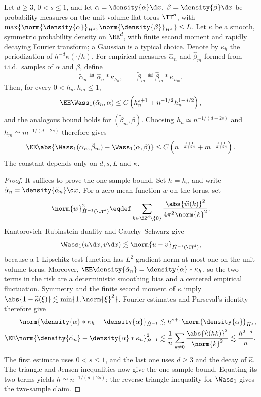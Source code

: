 \begin{prop}\label{prop-smooth-plugin-w1-rate}
	Let \(d\geq3\), \(0<s\leq1\), and let \(\alpha=\density{\alpha}\d x\), \(\beta=\density{\beta}\d x\) be probability measures on the unit-volume flat torus \(\TT^d\), with \(\max\{\norm{\density{\alpha}}_{H^s},\norm{\density{\beta}}_{H^s}\}\leq L\). Let \(\kappa\) be a smooth, symmetric probability density on \(\RR^d\), with finite second moment and rapidly decaying Fourier transform; a Gaussian is a typical choice. Denote by \(\kappa_h\) the periodization of \(h^{-d}\kappa(\cdot/h)\). For empirical measures \(\hat\alpha_n\) and \(\hat\beta_m\) formed from i.i.d.\ samples of \(\alpha\) and \(\beta\), define
	\[
		\tilde\alpha_n
		\eqdef
		\hat\alpha_n\ast\kappa_{h_n},
		\qquad
		\tilde\beta_m
		\eqdef
		\hat\beta_m\ast\kappa_{h_m}.
	\]
	Then, for every \(0<h_n,h_m\leq1\),
	\[
		\EE\Wass_1(\tilde\alpha_n,\alpha)
		\leq
		C\left(h_n^{s+1}+n^{-1/2}h_n^{1-d/2}\right),
	\]
	and the analogous bound holds for \((\tilde\beta_m,\beta)\). Choosing \(h_n\simeq n^{-1/(d+2s)}\) and \(h_m\simeq m^{-1/(d+2s)}\) therefore gives
	\[
		\EE\abs{
			\Wass_1(\tilde\alpha_n,\tilde\beta_m)
			-
			\Wass_1(\alpha,\beta)}
		\leq
		C\left(n^{-\frac{s+1}{d+2s}}+m^{-\frac{s+1}{d+2s}}\right).
	\]
	The constant depends only on \(d,s,L\) and \(\kappa\).
\end{prop}

\begin{proof}
	It suffices to prove the one-sample bound. Set \(h=h_n\) and write \(\tilde\alpha_n=\density{\tilde\alpha_n}\d x\). For a zero-mean function \(w\) on the torus, set
	\[
		\norm{w}_{\dot H^{-1}(\TT^d)}^2
		\eqdef
		\sum_{k\in\ZZ^d\setminus\{0\}}
		\frac{\abs{\widehat w(k)}^2}{4\pi^2\norm{k}^2}.
	\]
	Kantorovich--Rubinstein duality and Cauchy--Schwarz give
	\[
		\Wass_1(u\d x,v\d x)
		\lesssim
		\norm{u-v}_{\dot H^{-1}(\TT^d)},
	\]
	because a \(1\)-Lipschitz test function has \(L^2\)-gradient norm at most one on the unit-volume torus. Moreover, \(\EE\density{\tilde\alpha_n}=\density{\alpha}\ast\kappa_h\), so the two terms in the risk are a deterministic smoothing bias and a centered empirical fluctuation. Symmetry and the finite second moment of \(\kappa\) imply \(\abs{1-\widehat\kappa(\xi)}\lesssim\min\{1,\norm{\xi}^2\}\). Fourier estimates and Parseval's identity therefore give
	\[
		\begin{aligned}
			\norm{\density{\alpha}\ast\kappa_h-\density{\alpha}}_{\dot H^{-1}}
			&\lesssim h^{s+1}\norm{\density{\alpha}}_{H^s},\\
			\EE\norm{\density{\tilde\alpha_n}-\density{\alpha}\ast\kappa_h}_{\dot H^{-1}}^2
			&\lesssim \frac1n\sum_{k\neq0}\frac{\abs{\widehat\kappa(hk)}^2}{\norm{k}^2}
			\lesssim \frac{h^{2-d}}n.
		\end{aligned}
	\]
	The first estimate uses \(0<s\leq1\), and the last one uses \(d\geq3\) and the decay of \(\widehat\kappa\). The triangle and Jensen inequalities now give the one-sample bound. Equating its two terms yields \(h\simeq n^{-1/(d+2s)}\); the reverse triangle inequality for \(\Wass_1\) gives the two-sample claim.
\end{proof}

